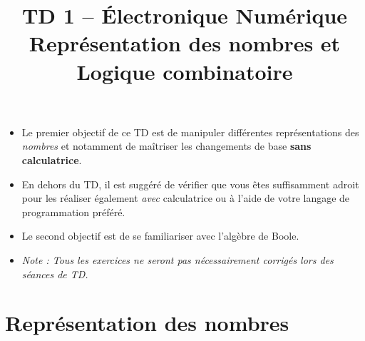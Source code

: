 \documentclass[a4paper,11pt]{article}
\title{\textcolor{primary}{\Huge\bfseries TD 1 -- Électronique Numérique}\\[0.5em] \Large Représentation des nombres et Logique combinatoire}
\author{}
\date{}
\begin{document}
\maketitle
\thispagestyle{fancy}   %
\vspace{-2em}

\begin{notebox}
\begin{itemize}
    \item Le premier objectif de ce TD est de manipuler différentes représentations des \textit{nombres} et notamment de maîtriser les changements de base \textbf{sans calculatrice}.
    \item En dehors du TD, il est suggéré de vérifier que vous êtes suffisamment adroit pour les réaliser également \textit{avec} calculatrice ou à l'aide de votre langage de programmation préféré.
    \item Le second objectif est de se familiariser avec l'algèbre de Boole.
    \item \textit{Note : Tous les exercices ne seront pas nécessairement corrigés lors des séances de TD.}
\end{itemize}
\end{notebox}

\vspace{1em}

\part{Représentation des nombres}
\end{document}
